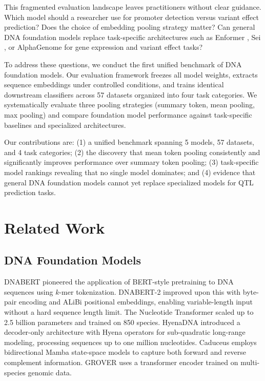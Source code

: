 \documentclass[11pt]{article}
\begin{document}
This fragmented evaluation landscape leaves practitioners without clear guidance. Which model should a researcher use for promoter detection versus variant effect prediction? Does the choice of embedding pooling strategy matter? Can general DNA foundation models replace task-specific architectures such as Enformer \citep{avsec2021enformer}, Sei \citep{chen2022sei}, or AlphaGenome for gene expression and variant effect tasks?

To address these questions, we conduct the first unified benchmark of DNA foundation models. Our evaluation framework freezes all model weights, extracts sequence embeddings under controlled conditions, and trains identical downstream classifiers across 57 datasets organized into four task categories. We systematically evaluate three pooling strategies (summary token, mean pooling, max pooling) and compare foundation model performance against task-specific baselines and specialized architectures.

Our contributions are: (1) a unified benchmark spanning 5 models, 57 datasets, and 4 task categories; (2) the discovery that mean token pooling consistently and significantly improves performance over summary token pooling; (3) task-specific model rankings revealing that no single model dominates; and (4) evidence that general DNA foundation models cannot yet replace specialized models for QTL prediction tasks.

\section{Related Work}

\subsection{DNA Foundation Models}
DNABERT \citep{ji2021dnabert} pioneered the application of BERT-style pretraining to DNA sequences using $k$-mer tokenization. DNABERT-2 \citep{zhou2023dnabert2} improved upon this with byte-pair encoding and ALiBi positional embeddings, enabling variable-length input without a hard sequence length limit. The Nucleotide Transformer \citep{dallatorre2023nucleotide} scaled up to 2.5 billion parameters and trained on 850 species. HyenaDNA \citep{nguyen2024hyenadna} introduced a decoder-only architecture with Hyena operators for sub-quadratic long-range modeling, processing sequences up to one million nucleotides. Caduceus \citep{schiff2024caduceus} employs bidirectional Mamba state-space models to capture both forward and reverse complement information. GROVER \citep{sanabria2024grover} uses a transformer encoder trained on multi-species genomic data.
\end{document}
